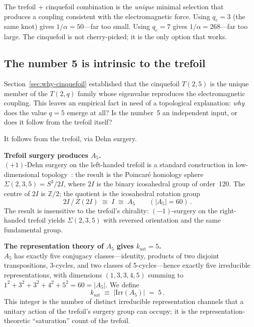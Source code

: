 \documentclass[11pt]{article}
\begin{document}
The trefoil + cinquefoil combination is the \emph{unique} minimal
selection that produces a coupling consistent with the
electromagnetic force.  Using $q_e = 3$ (the same knot) gives
$1/\alpha = 50$---far too small.  Using $q_e = 7$ gives
$1/\alpha = 268$---far too large.  The cinquefoil is not
cherry-picked; it is the only option that works.

\subsection{The number 5 is intrinsic to the trefoil}
\label{sec:dehn-surgery}

Section~\ref{sec:why-cinquefoil} established that the cinquefoil
$T(2,5)$ is the unique member of the $T(2,q)$ family whose
eigenvalue reproduces the electromagnetic coupling.  This leaves
an empirical fact in need of a topological explanation: \emph{why}
does the value $q = 5$ emerge at all?  Is the number~5 an
independent input, or does it follow from the trefoil itself?

It follows from the trefoil, via Dehn surgery.

\medskip
\noindent\textbf{Trefoil surgery produces $A_5$.}\\
$(+1)$-Dehn surgery on the left-handed trefoil is a standard
construction in low-dimensional topology~\cite{Birman1974,Rolfsen}:
the result is the Poincar\'e homology sphere
$\Sigma(2,3,5) = S^3/2I$, where $2I$ is the binary icosahedral
group of order~120.  The centre of $2I$ is $\mathbb{Z}/2$; the
quotient is the icosahedral rotation group
\begin{equation}
\label{eq:A5-from-trefoil}
  2I\,/\,Z(2I) \;\cong\; I \;\cong\; A_5
  \qquad (|A_5| = 60)\,.
\end{equation}
The result is insensitive to the trefoil's chirality: $(-1)$-surgery
on the right-handed trefoil yields $\Sigma(2,3,5)$ with reversed
orientation and the same fundamental group.

\medskip
\noindent\textbf{The representation theory of $A_5$ gives
$k_\text{sat} = 5$.}\\
$A_5$ has exactly five conjugacy classes---identity, products of
two disjoint transpositions, 3-cycles, and two classes of
5-cycles---hence exactly five irreducible representations, with
dimensions $(1, 3, 3, 4, 5)$ summing to
$1^2 + 3^2 + 3^2 + 4^2 + 5^2 = 60 = |A_5|$.  We define
\begin{equation}
\label{eq:ksat}
  k_\text{sat} \;\equiv\; |\mathrm{Irr}(A_5)| \;=\; 5\,.
\end{equation}
This integer is the number of distinct irreducible representation
channels that a unitary action of the trefoil's surgery group can
occupy; it is the representation-theoretic ``saturation'' count of
the trefoil.
\end{document}

